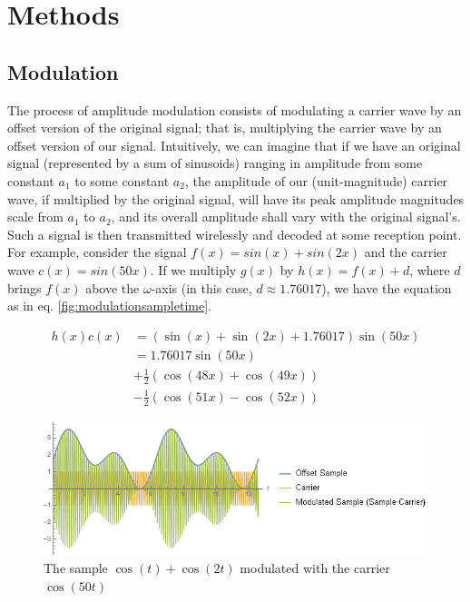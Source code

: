 \documentclass[journal]{IEEEtran}
\begin{document}
\section{Methods}
\subsection{Modulation}
The process of amplitude modulation consists of modulating a carrier wave by an offset version of the original signal; that is, multiplying the carrier wave by an offset version of our signal. Intuitively, we can imagine that if we have an original signal (represented by a sum of sinusoids) ranging in amplitude from some constant $a_1$ to some constant $a_2$, the amplitude of our (unit-magnitude) carrier wave, if multiplied by the original signal, will have its peak amplitude magnitudes scale from $a_1$ to $a_2$, and its overall amplitude shall vary with the original signal's. Such a signal is then transmitted wirelessly and decoded at some reception point. For example, consider the signal $f(x)=sin(x)+sin(2x)$ and the carrier wave $c(x)=sin(50x)$. If we multiply $g(x)$ by $h(x)=f(x)+d$, where $d$ brings $f(x)$ above the $\omega$-axis (in this case, $d\approx1.76017$), we have the equation as in eq. \eqref{fig:modulationsampletime}.

\begin{equation}
\begin{split}
h\left(x\right)c\left(x\right)&=\left(\sin{\left(x\right)}+\sin{\left(2x\right)}+1.76017\right)\sin{\left(50x\right)}\\
    &=1.76017\sin{\left(50x\right)} \\
    &+\frac{1}{2}\left(\cos{\left(48x\right)}+\cos{\left(49x\right)}\right)\\
    &-\frac{1}{2}\left(\cos{\left(51x\right)}-\cos{\left(52x\right)}\right)
\end{split}
\label{modulatedsignal}  
\end{equation}

\begin{figure}
    \centering
    \includegraphics[width=\columnwidth]{ExampleV3TimeLong.png}
    \caption{The sample $\cos(t)+\cos(2t)$ modulated with the carrier $\cos(50t)$}
    \label{fig:modulationsampletime}
\end{figure}
\end{document}
